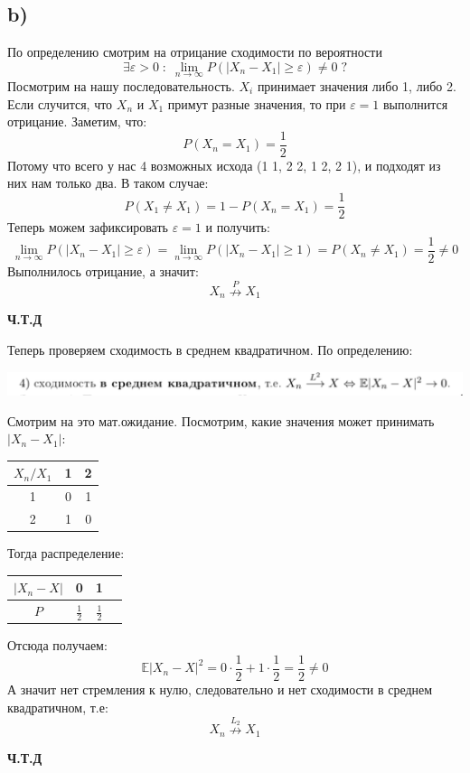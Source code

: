 \documentclass[a4paper,12pt]{article}
\begin{document}
\subsection*{b)}
По определению смотрим на отрицание сходимости по вероятности
\[
\exists \varepsilon > 0 \; : \; 
\lim_{n \rightarrow \infty} P
(
\left|
X_n - X_1
\right|
\geq \varepsilon
)
\neq 0 
\; ?
\] 
 Посмотрим на нашу последовательность. $X_i$ принимает значения либо 1, либо 2. Если случится, что $X_n$ и $X_1$ примут разные значения, то при $\varepsilon = 1$ выполнится отрицание. Заметим, что:
\[
P(X_n = X_1) = \frac{1}{2}
\]
Потому что всего у нас 4 возможных исхода (1 1, 2 2, 1 2, 2 1), и подходят из них нам только два. В таком случае:
\[
P(X_1 \neq X_1) = 1 - P(X_n = X_1) = \frac{1}{2}
\]
Теперь можем зафиксировать $\varepsilon = 1$ и получить:
\[
\lim_{n \rightarrow \infty} P
(
\left|
X_n - X_1
\right|
\geq \varepsilon
)
=
\lim_{n \rightarrow \infty} P
(
\left|
X_n - X_1
\right|
\geq 1
)
=
P(X_n \neq X_1)
=
\frac{1}{2}
\neq 0 
\]
Выполнилось отрицание, а значит:
\[
X_n \overset{P}{\nrightarrow} X_1
\]
\begin{center}
\textbf{Ч.Т.Д} 
\end{center}
Теперь проверяем сходимость в среднем квадратичном. По определению:
\begin{center}
\includegraphics[scale=0.5]{5.png}
\end{center}
Смотрим на это мат.ожидание. Посмотрим, какие значения может принимать $|X_n - X_1|$:
\begin{center}
\begin{tabular}{|c|c|c|}
\hline
$X_n / X_1$& 1 & 2 \\
\hline
1 & 0 & 1 \\
\hline
2 & 1 & 0 \\
\hline
\end{tabular}
\end{center}
Тогда распределение:
\begin{center}
\begin{tabular}{|c|c|c|c|}
\hline
 $|X_n - X|$& 0 &1 \\
\hline
 $P$&  $\frac{1}{2}$& $\frac{1}{2}$ \\
\hline
\end{tabular}
\end{center}
Отсюда получаем:
\[
\mathbb{E} 
\left|
X_n - X
\right|^2 
=
0 \cdot \frac12 + 1 \cdot \frac12 = \frac12 \neq 0
\]
А значит нет стремления к нулю, следовательно и нет сходимости в среднем квадратичном, т.е:
\[
X_n \overset{L_2}{\nrightarrow} X_1
\]
\begin{center}
\textbf{Ч.Т.Д} 
\end{center}
\end{document}
